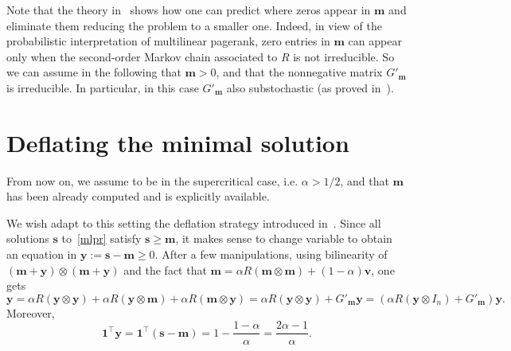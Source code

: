 \documentclass[10pt]{paper}
\begin{document}
Note that the theory in~\cite[Section~9]{Pol13} shows how one can predict where zeros appear in ${\mathbf{m}}$ and eliminate them reducing the problem to a smaller one. Indeed, in view of the probabilistic interpretation of multilinear pagerank, zero entries in ${\mathbf{m}}$ can appear only when the second-order Markov chain associated to $R$ is not irreducible. So we can assume in the following that ${\mathbf{m}} > 0$, and that the nonnegative matrix $G'_{\mathbf{m}}$ is irreducible. In particular, in this case $G'_{\mathbf{m}}$ also substochastic (as proved in~\cite[Theorem~6]{Pol13}).

\section{Deflating the minimal solution} \label{sec:deflating}
From now on, we assume to be in the supercritical case, i.e. $\alpha>1/2$, and that ${\mathbf{m}}$ has been already computed and is explicitly available. 

We wish adapt to this setting the deflation strategy introduced in~\cite{MeiP11}. Since all solutions ${\mathbf{s}}$ to~\eqref{mlpr} satisfy ${\mathbf{s}} \geq {\mathbf{m}}$, it makes sense to change variable to obtain an equation in ${\mathbf{y}} := {\mathbf{s}} - {\mathbf{m}} \geq 0$. After a few manipulations, using bilinearity of $({\mathbf{m}}+{\mathbf{y}})\otimes ({\mathbf{m}}+{\mathbf{y}})$ and the fact that ${\mathbf{m}} = \alpha R({\mathbf{m}} \otimes {\mathbf{m}}) + (1-\alpha){\mathbf{v}}$, one gets
\begin{equation} \label{optimistic}
	{\mathbf{y}} = \alpha R({\mathbf{y}} \otimes {\mathbf{y}}) + \alpha R({\mathbf{y}} \otimes {\mathbf{m}}) + \alpha R({\mathbf{m}} \otimes {\mathbf{y}}) = \alpha R({\mathbf{y}} \otimes {\mathbf{y}}) + G'_{\mathbf{m}}{\mathbf{y}} = (\alpha R({\mathbf{y}} \otimes I_n) + G'_{\mathbf{m}}){\mathbf{y}}.
\end{equation}
Moreover,
\begin{equation} \label{normy}
	{\mathbf{1}}^\top {\mathbf{y}} = {\mathbf{1}}^\top ({\mathbf{s}}-{\mathbf{m}}) = 1-\frac{1-\alpha}{\alpha} = \frac{2\alpha-1}{\alpha}.	
\end{equation}
\end{document}
